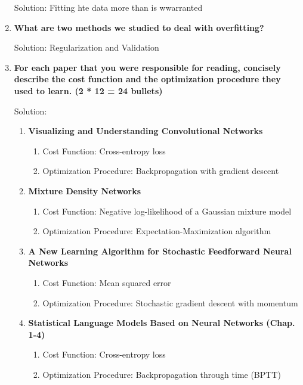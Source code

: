 \documentclass[10pt]{article} %
\begin{document}
\begin{enumerate}
Solution: Fitting hte data more than is wwarranted
\bigskip


\item \textbf{What are two methods we studied to deal with overfitting?}

Solution: Regularization and Validation
\bigskip


\item \textbf{For each paper that you were responsible for reading, concisely describe the cost function and the optimization procedure they used to learn. (2 * 12 = 24 bullets)}

Solution:
\begin{enumerate}
    \item \textbf{Visualizing and Understanding Convolutional Networks}
    \begin{enumerate}
        \item Cost Function: Cross-entropy loss
        \item Optimization Procedure: Backpropagation with gradient descent
    \end{enumerate}

    \item \textbf{Mixture Density Networks}
    \begin{enumerate}
        \item Cost Function: Negative log-likelihood of a Gaussian mixture model
        \item Optimization Procedure: Expectation-Maximization algorithm
    \end{enumerate}

    \item \textbf{A New Learning Algorithm for Stochastic Feedforward Neural Networks}
    \begin{enumerate}
        \item Cost Function: Mean squared error
        \item Optimization Procedure: Stochastic gradient descent with momentum
    \end{enumerate}

    \item \textbf{Statistical Language Models Based on Neural Networks (Chap. 1-4)}
    \begin{enumerate}
        \item Cost Function: Cross-entropy loss
        \item Optimization Procedure: Backpropagation through time (BPTT)
    \end{enumerate}


\end{enumerate}
\end{enumerate}
\end{document}
